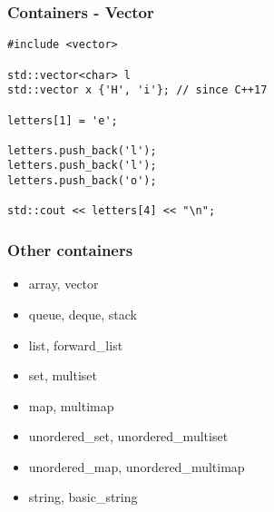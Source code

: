 \begin{frame}[fragile]
    \frametitle{Containers - Vector}
    \begin{lstlisting}[numbers=none]
#include <vector>

std::vector<char> l
std::vector x {'H', 'i'}; // since C++17

letters[1] = 'e';

letters.push_back('l');
letters.push_back('l');
letters.push_back('o');

std::cout << letters[4] << "\n";
    \end{lstlisting}
\end{frame}

\begin{frame}[fragile]
    \frametitle{Other containers}
    \begin{itemize}
        \item array, vector
        \item queue, deque, stack
        \item list, forward\_list
        \item set, multiset
        \item map, multimap
        \item unordered\_set, unordered\_multiset
        \item unordered\_map, unordered\_multimap
        \item string, basic\_string
    \end{itemize}
\end{frame}

